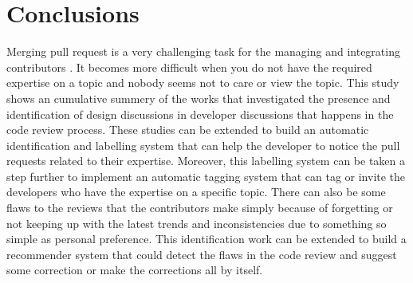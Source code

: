 \section{Conclusions}
\label{sect:conclusions}
Merging pull request is a very challenging task for the managing and integrating contributors \cite{Gousios2015}. It becomes more difficult when you do not have the required expertise on a topic and nobody seems not to care or view the topic. This study shows an cumulative summery of the works that investigated the presence and identification of design discussions in developer discussions that happens in the code review process. These studies can be extended to build an automatic identification and labelling system that can help the developer to notice the pull requests related to their expertise. Moreover, this labelling system can be taken a step further to implement an automatic tagging system that can tag or invite the developers who have the expertise on a specific topic. There can also be some flaws to the reviews that the contributors make simply because of forgetting or not keeping up with the latest trends and inconsistencies due to something so simple as personal preference. This identification work can be extended to build a recommender system that could detect the flaws in the code review and suggest some correction or make the corrections all by itself. 
